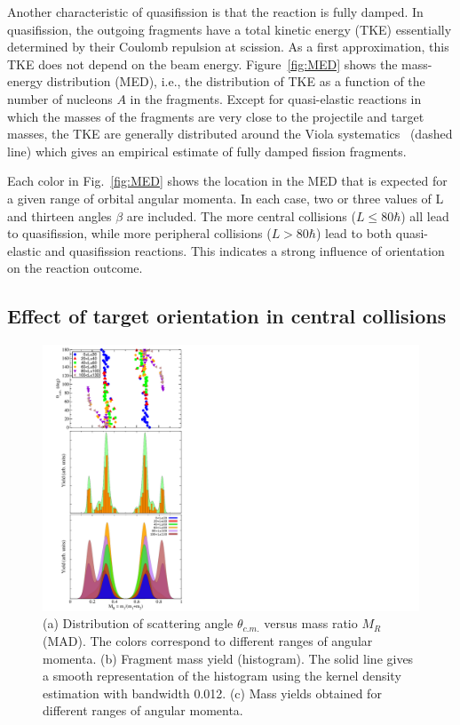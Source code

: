 Another characteristic of quasifission is that the reaction is fully damped.
In quasifission, the outgoing fragments have a total kinetic energy (TKE) essentially determined by their Coulomb repulsion at scission.
As a first approximation, this TKE does not depend on the beam energy.
Figure~\ref{fig:MED} shows the mass-energy distribution (MED), i.e., the distribution of TKE as a function of the number of nucleons $A$ in the fragments.
Except for quasi-elastic reactions in which the masses of the fragments are very close to the projectile and target masses, the TKE are generally distributed around the Viola systematics~\citep{viola1985,hinde1987} (dashed line) which gives an empirical estimate of fully damped fission fragments.

Each color in Fig.~\ref{fig:MED} shows the location in the MED that is expected for a given range of orbital angular momenta. In each case, two or three values of L and thirteen angles $\beta$  are included.
The more central collisions ($L\le80 \hbar$) all lead to quasifission, while more peripheral collisions ($L>80\hbar$) lead to both quasi-elastic and quasifission reactions.
This indicates a strong influence of  orientation on the reaction outcome.

\subsection{Effect of target orientation in central collisions}
\begin{figure}
	\centering
	\includegraphics*[scale=0.9]{../Figures/CaBk/MAD.pdf}
	\caption{(a) Distribution of scattering angle $\theta_{c.m.}$ versus mass ratio $M_R$ (MAD). The colors correspond to different ranges of angular momenta. (b) Fragment mass yield (histogram). The solid line gives a smooth representation of the histogram using the kernel density estimation with bandwidth 0.012. (c) Mass yields obtained for different ranges of angular momenta.}
	\label{fig:MAD}
\end{figure}

